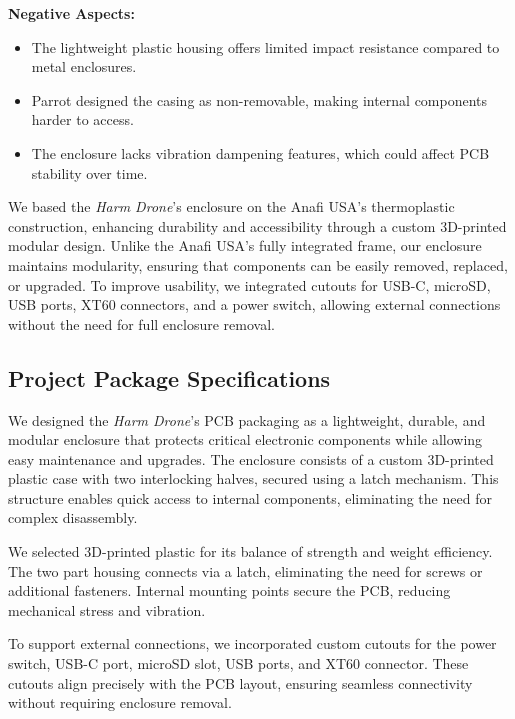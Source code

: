 \documentclass[12pt]{article}
\begin{document}
\textbf{Negative Aspects:}
\begin{itemize}
    \item The lightweight plastic housing offers limited impact resistance compared to metal enclosures.
    \item Parrot designed the casing as non-removable, making internal components harder to access.
    \item The enclosure lacks vibration dampening features, which could affect PCB stability over time.
\end{itemize}

\par We based the \textit{Harm Drone}’s enclosure on the Anafi USA’s thermoplastic construction, enhancing durability and accessibility through a custom 3D-printed modular design. Unlike the Anafi USA’s fully integrated frame, our enclosure maintains modularity, ensuring that components can be easily removed, replaced, or upgraded. To improve usability, we integrated cutouts for USB-C, microSD, USB ports, XT60 connectors, and a power switch, allowing external connections without the need for full enclosure removal.

\subsection{Project Package Specifications}

\par We designed the \textit{Harm Drone}’s PCB packaging as a lightweight, durable, and modular enclosure that protects critical electronic components while allowing easy maintenance and upgrades. The enclosure consists of a custom 3D-printed plastic case with two interlocking halves, secured using a latch mechanism. This structure enables quick access to internal components, eliminating the need for complex disassembly.

\par We selected 3D-printed plastic for its balance of strength and weight efficiency. The two part housing connects via a latch, eliminating the need for screws or additional fasteners. Internal mounting points secure the PCB, reducing mechanical stress and vibration.

\par To support external connections, we incorporated custom cutouts for the power switch, USB-C port, microSD slot, USB ports, and XT60 connector. These cutouts align precisely with the PCB layout, ensuring seamless connectivity without requiring enclosure removal.
\end{document}
